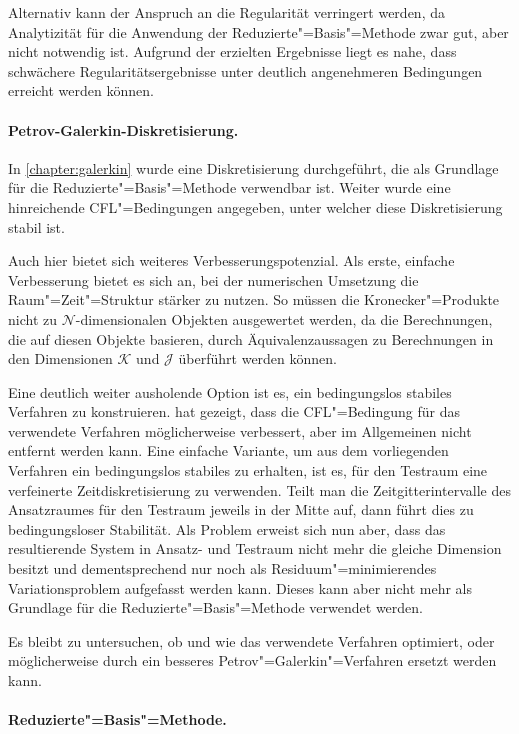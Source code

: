 \documentclass[../main.tex]{subfiles}
\begin{document}
Alternativ kann der Anspruch an die Regularität verringert werden, da Analytizität für die Anwendung der Reduzierte"=Basis"=Methode zwar gut, aber nicht notwendig ist.
Aufgrund der erzielten Ergebnisse liegt es nahe, dass schwächere Regularitätsergebnisse unter deutlich angenehmeren Bedingungen erreicht werden können.

\paragraph{Petrov-Galerkin-Diskretisierung.} %
\label{par:petrov_galerkin_diskretisierung}

In \cref{chapter:galerkin} wurde eine Diskretisierung durchgeführt, die als Grundlage für die Reduzierte"=Basis"=Methode verwendbar ist.
Weiter wurde eine hinreichende CFL"=Bedingungen angegeben, unter welcher diese Diskretisierung stabil ist.

Auch hier bietet sich weiteres Verbesserungspotenzial.
Als erste, einfache Verbesserung bietet es sich an, bei der numerischen Umsetzung die Raum"=Zeit"=Struktur stärker zu nutzen.
So müssen die Kronecker"=Produkte nicht zu $\mathcal N$-dimensionalen Objekten ausgewertet werden, da die Berechnungen, die auf diesen Objekte basieren, durch Äquivalenzaussagen zu Berechnungen in den Dimensionen $\mathcal K$ und $\mathcal J$ überführt werden können.

Eine deutlich weiter ausholende Option ist es, ein bedingungslos stabiles Verfahren zu konstruieren.
\textcite[Section 5.2]{Andreev:2012ep} hat gezeigt, dass die CFL"=Bedingung für das verwendete Verfahren möglicherweise verbessert, aber im Allgemeinen nicht entfernt werden kann.
Eine einfache Variante, um aus dem vorliegenden Verfahren ein bedingungslos stabiles zu erhalten, ist es, für den Testraum eine verfeinerte Zeitdiskretisierung zu verwenden.
Teilt man die Zeitgitterintervalle des Ansatzraumes für den Testraum jeweils in der Mitte auf, dann führt dies zu bedingungsloser Stabilität.
Als Problem erweist sich nun aber, dass das resultierende System in Ansatz- und Testraum nicht mehr die gleiche Dimension besitzt und dementsprechend nur noch als Residuum"=minimierendes Variationsproblem aufgefasst werden kann.
Dieses kann aber nicht mehr als Grundlage für die Reduzierte"=Basis"=Methode verwendet werden.

Es bleibt zu untersuchen, ob und wie das verwendete Verfahren optimiert, oder möglicherweise durch ein besseres Petrov"=Galerkin"=Verfahren ersetzt werden kann.

\paragraph{Reduzierte"=Basis"=Methode.} %
\label{par:reduzierte_basis_methode}
\end{document}
